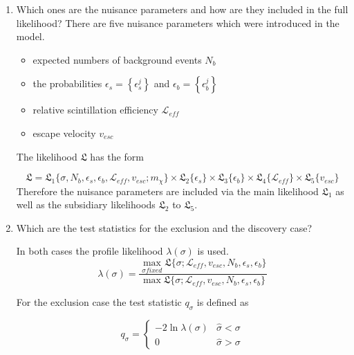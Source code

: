 \documentclass[10pt]{article}
\newenvironment{myfont}{\fontfamily{put}\selectfont}{\par}
\newcommand{\likelihood}{\mathfrak{L}}
\begin{document}
\begin{myfont}
\begin{enumerate}[label = \textbf{\roman*}.]
  \item Which  ones  are  the  nuisance  parameters  and  how  are  they  included  in  the  full likelihood?
  \noindent
  There are five nuisance parameters which were introduced in the model.
  \begin{itemize}
      \item expected numbers of background events $N_b$
      \item the probabilities $\epsilon_s = \left\{ \epsilon^j_s\right\}$ and $\epsilon_b = \left\{ \epsilon^j_b\right\}$
      \item relative scintillation efficiency $\mathcal{L}_{eff}$
      \item escape velocity $v_{esc}$
  \end{itemize}
  The likelihood $\likelihood$ has the form

  \begin{equation}
      \likelihood = \likelihood_1\{\sigma, N_b, \epsilon_s, \epsilon_b, \mathcal{L}_{eff}, v_{esc}; m_{\chi}\} \times \likelihood_2\{\epsilon_s\} \times \likelihood_3\{\epsilon_b\} \times \likelihood_4\{\mathcal{L}_{eff}\} \times \likelihood_5\{v_{esc}\}
  \end{equation}
  Therefore the nuisance parameters are included via the main likelihood $\likelihood_1$ as well as the subsidiary likelihoods $\likelihood_2$ to $\likelihood_5$.

  \item Which are the test statistics for the exclusion and the discovery case?
  \noindent

  In both cases the profile likelihood $\lambda{(\sigma)}$ is used.
  \begin{equation}
      \lambda(\sigma) = \frac{\max_{\sigma fixed} \likelihood\{\sigma; \mathcal{L}_{eff}, v_{esc}, N_b, \epsilon_s, \epsilon_b\}}{\max \likelihood\{\sigma; \mathcal{L}_{eff}, v_{esc}, N_b, \epsilon_s, \epsilon_b\}}
  \end{equation}

  For the exclusion case the test statistic $q_{\sigma}$ is defined as

  \begin{equation}
      q_{\sigma} = \begin{cases}
        -2 \ln{\lambda{(\sigma)}}   &   \hat{\sigma} < \sigma \\
        0                           &   \hat{\sigma} > \sigma
        \end{cases}
  \end{equation}


\end{enumerate}
\end{myfont}
\end{document}
